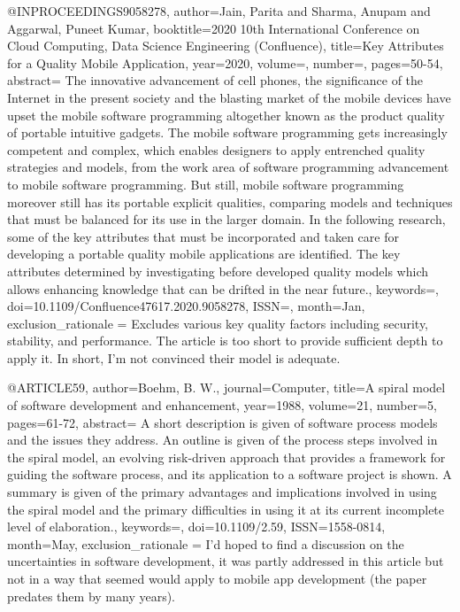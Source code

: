 @INPROCEEDINGS{9058278,  
  author={Jain, Parita and Sharma, Anupam and Aggarwal, Puneet Kumar},  
  booktitle={2020 10th International Conference on Cloud Computing, Data Science   Engineering (Confluence)},  
  title={Key Attributes for a Quality Mobile Application}, 
  year={2020},  
  volume={}, 
  number={}, 
  pages={50-54}, 
  abstract={
    The innovative advancement of cell phones, the significance of the Internet in the present society and the blasting market of the mobile devices have upset the mobile software programming altogether known as the product quality of portable intuitive gadgets. The mobile software programming gets increasingly competent and complex, which enables designers to apply entrenched quality strategies and models, from the work area of software programming advancement to mobile software programming. But still, mobile software programming moreover still has its portable explicit qualities, comparing models and techniques that must be balanced for its use in the larger domain. In the following research, some of the key attributes that must be incorporated and taken care for developing a portable quality mobile applications are identified. The key attributes determined by investigating before developed quality models which allows enhancing knowledge that can be drifted in the near future.},  
  keywords={},  
  doi={10.1109/Confluence47617.2020.9058278},
  ISSN={},
  month={Jan},
  exclusion_rationale = {Excludes various key quality factors including security, stability, and performance. The article is too short to provide sufficient depth to apply it. In short, I'm not convinced their model is adequate.}
}

@ARTICLE{59,
  author={Boehm, B. W.}, 
  journal={Computer},  
  title={A spiral model of software development and enhancement},  
  year={1988},
  volume={21},
  number={5},
  pages={61-72},
  abstract={
    A short description is given of software process models and the issues they address. An outline is given of the process steps involved in the spiral model, an evolving risk-driven approach that provides a framework for guiding the software process, and its application to a software project is shown. A summary is given of the primary advantages and implications involved in using the spiral model and the primary difficulties in using it at its current incomplete level of elaboration.}, 
  keywords={},  
  doi={10.1109/2.59}, 
  ISSN={1558-0814}, 
  month={May},
  exclusion_rationale = {I'd hoped to find a discussion on the uncertainties in software development, it was partly addressed in this article but not in a way that seemed would apply to mobile app development (the paper predates them by many years).}
}

